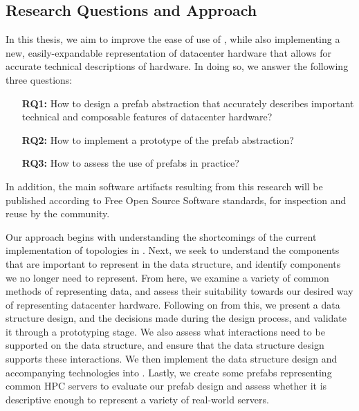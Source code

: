 \documentclass[11pt]{article}
\begin{document}
	\subsection{Research Questions and Approach}
		In this thesis, we aim to improve the ease of use of \opendc{}, while also implementing a new, easily-expandable representation of datacenter hardware that allows for accurate technical descriptions of hardware. 
		In doing so, we answer the following three questions:
		\begin{itemize}
			\item [\textbf{RQ1:}] How to design a prefab abstraction that accurately describes important technical and composable features of datacenter hardware?
			\item [\textbf{RQ2:}] How to implement a prototype of the prefab abstraction?
			\item [\textbf{RQ3:}] How to assess the use of prefabs in practice?

			
		\end{itemize}

		In addition, the main software artifacts resulting from this research will be published according to Free Open Source Software standards, for inspection and reuse by the community.
	
		Our approach begins with understanding the shortcomings of the current implementation of topologies in \opendc{}.
		Next, we seek to understand the components that are important to represent in the data structure, and identify components we no longer need to represent.
		From here, we examine a variety of common methods of representing data, and assess their suitability towards our desired way of representing datacenter hardware.
		Following on from this, we present a data structure design, and the decisions made during the design process, and validate it through a prototyping stage.
		We also assess what interactions need to be supported on the data structure, and ensure that the data structure design supports these interactions.
		We then implement the data structure design and accompanying technologies into \opendc{}.
		Lastly, we create some prefabs representing common HPC servers to evaluate our prefab design and assess whether it is descriptive enough to represent a variety of real-world servers.
	
\end{document}
